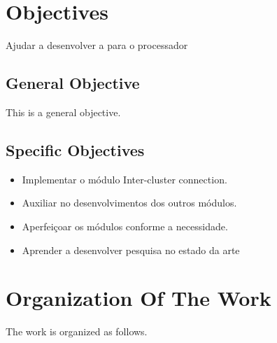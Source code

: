 \section{Objectives}
    Ajudar a desenvolver a \hal para o processador \mppa

\subsection{General Objective}
    This is a general objective.
    
\subsection{Specific Objectives}
    \begin{itemize}
        \item Implementar o módulo Inter-cluster connection.
        \item Auxiliar no desenvolvimentos dos outros módulos.
        \item Aperfeiçoar os módulos conforme a necessidade.
        \item Aprender a desenvolver pesquisa no estado da arte
    \end{itemize}
    
\section{Organization Of The Work}
    The work is organized as follows.